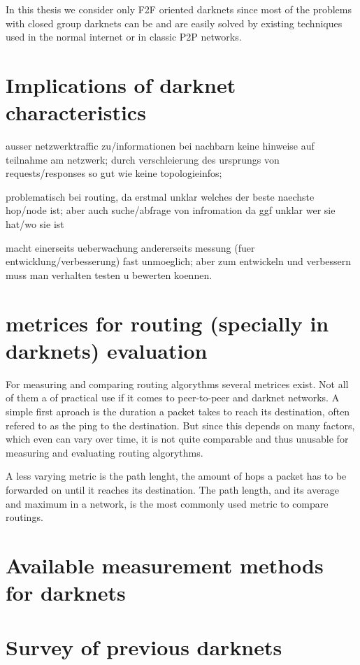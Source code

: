 In this thesis we consider only F2F oriented darknets since most of the problems with closed group darknets can be and are easily solved by existing techniques used in the normal internet or in classic P2P networks.

\section{Implications of darknet characteristics}

ausser netzwerktraffic zu/informationen bei nachbarn keine hinweise auf teilnahme am netzwerk; durch verschleierung des ursprungs von requests/responses so gut wie keine topologieinfos;

problematisch bei routing, da erstmal unklar welches der beste naechste hop/node ist; aber auch suche/abfrage von infromation da ggf unklar wer sie hat/wo sie ist

macht einerseits ueberwachung andererseits messung (fuer entwicklung/verbesserung) fast unmoeglich; aber zum entwickeln und verbessern muss man verhalten testen u bewerten koennen.

\section{metrices for routing (specially in darknets) evaluation}

For measuring and comparing routing algorythms several metrices exist. Not all of them a of practical use if it comes to peer-to-peer and darknet networks. A simple first aproach  is the duration a packet takes to reach its destination, often refered to as the ping to the destination. But since this depends on many factors, which even can vary over time, it is not quite comparable and thus unusable for measuring and evaluating routing algorythms.

A less varying metric is the path lenght, the amount of hops a packet has to be forwarded on until it reaches its destination. The path length, and its average and maximum in a network, is the most commonly used metric to compare routings.



\section{Available measurement methods for darknets}


\section{Survey of previous darknets}


